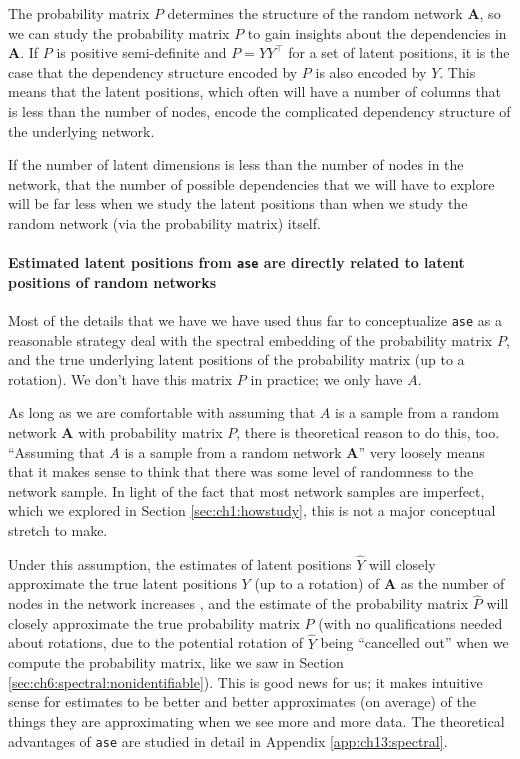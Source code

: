 The probability matrix $P$ determines the structure of the random network $\mathbf A$, so we can study the probability matrix $P$ to gain insights about the dependencies in $\mathbf A$. If $P$ is positive semi-definite and $P = YY^\top$ for a set of latent positions, it is the case that the dependency structure encoded by $P$ is also encoded by $Y$. This means that the latent positions, which often will have a number of columns that is less than the number of nodes, encode the complicated dependency structure of the underlying network.

If the number of latent dimensions is less than the number of nodes in the network, that the number of possible dependencies that we will have to explore will be far less when we study the latent positions than when we study the random network (via the probability matrix) itself. 

\paragraph*{Estimated latent positions from \texttt{ase} are directly related to latent positions of random networks}

Most of the details that we have we have used thus far to conceptualize \texttt{ase} as a reasonable strategy deal with the spectral embedding of the probability matrix $P$, and the true underlying latent positions of the probability matrix (up to a rotation). We don't have this matrix $P$ in practice; we only have $A$. 

As long as we are comfortable with assuming that $A$ is a sample from a random network $\mathbf A$ with probability matrix $P$, there is theoretical reason to do this, too. ``Assuming that $A$ is a sample from a random network $\mathbf A$'' very loosely means that it makes sense to think that there was some level of randomness to the network sample. In light of the fact that most network samples are imperfect, which we explored in Section \ref{sec:ch1:howstudy}, this is not a major conceptual stretch to make.

Under this assumption, the estimates of latent positions $\hat Y$ will closely approximate the true latent positions $Y$ (up to a rotation) of $\mathbf A$ as the number of nodes in the network increases \cite{Sussman2012Sep,Athreya2017Jan,Rubin2022Sep}, and the estimate of the probability matrix $\hat P$ will closely approximate the true probability matrix $P$ (with no qualifications needed about rotations, due to the potential rotation of $\hat Y$ being ``cancelled out'' when we compute the probability matrix, like we saw in Section \ref{sec:ch6:spectral:nonidentifiable}). This is good news for us; it makes intuitive sense for estimates to be better and better approximates (on average) of the things they are approximating when we see more and more data. The theoretical advantages of \texttt{ase} are studied in detail in Appendix \ref{app:ch13:spectral}. 

